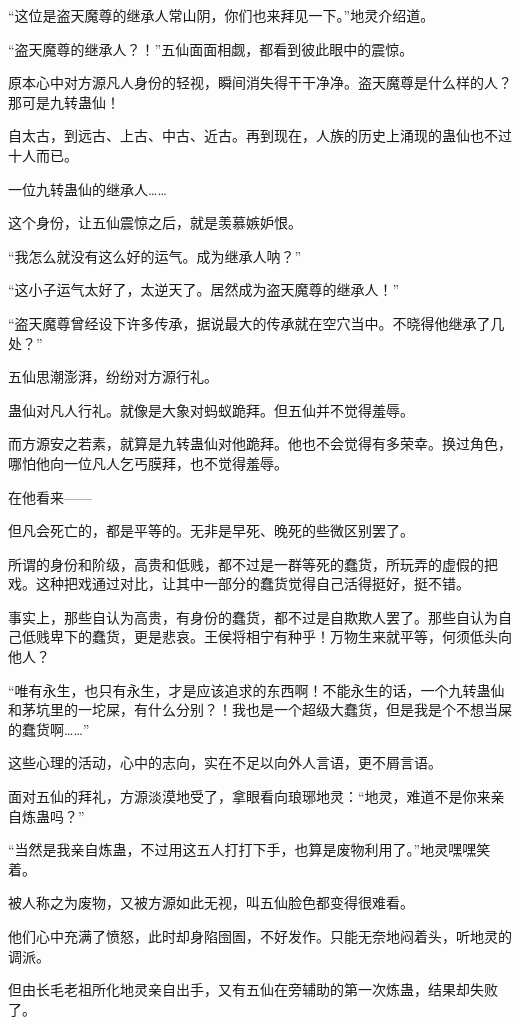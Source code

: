 \begin{this_body}
“这位是盗天魔尊的继承人常山阴，你们也来拜见一下。”地灵介绍道。

“盗天魔尊的继承人？！”五仙面面相觑，都看到彼此眼中的震惊。

原本心中对方源凡人身份的轻视，瞬间消失得干干净净。盗天魔尊是什么样的人？那可是九转蛊仙！

自太古，到远古、上古、中古、近古。再到现在，人族的历史上涌现的蛊仙也不过十人而已。

一位九转蛊仙的继承人……

这个身份，让五仙震惊之后，就是羡慕嫉妒恨。

“我怎么就没有这么好的运气。成为继承人呐？”

“这小子运气太好了，太逆天了。居然成为盗天魔尊的继承人！”

“盗天魔尊曾经设下许多传承，据说最大的传承就在空穴当中。不晓得他继承了几处？”

五仙思潮澎湃，纷纷对方源行礼。

蛊仙对凡人行礼。就像是大象对蚂蚁跪拜。但五仙并不觉得羞辱。

而方源安之若素，就算是九转蛊仙对他跪拜。他也不会觉得有多荣幸。换过角色，哪怕他向一位凡人乞丐膜拜，也不觉得羞辱。

在他看来——

但凡会死亡的，都是平等的。无非是早死、晚死的些微区别罢了。

所谓的身份和阶级，高贵和低贱，都不过是一群等死的蠢货，所玩弄的虚假的把戏。这种把戏通过对比，让其中一部分的蠢货觉得自己活得挺好，挺不错。

事实上，那些自认为高贵，有身份的蠢货，都不过是自欺欺人罢了。那些自认为自己低贱卑下的蠢货，更是悲哀。王侯将相宁有种乎！万物生来就平等，何须低头向他人？

“唯有永生，也只有永生，才是应该追求的东西啊！不能永生的话，一个九转蛊仙和茅坑里的一坨屎，有什么分别？！我也是一个超级大蠢货，但是我是个不想当屎的蠢货啊……”

这些心理的活动，心中的志向，实在不足以向外人言语，更不屑言语。

面对五仙的拜礼，方源淡漠地受了，拿眼看向琅琊地灵：“地灵，难道不是你来亲自炼蛊吗？”

“当然是我亲自炼蛊，不过用这五人打打下手，也算是废物利用了。”地灵嘿嘿笑着。

被人称之为废物，又被方源如此无视，叫五仙脸色都变得很难看。

他们心中充满了愤怒，此时却身陷囹圄，不好发作。只能无奈地闷着头，听地灵的调派。

但由长毛老祖所化地灵亲自出手，又有五仙在旁辅助的第一次炼蛊，结果却失败了。


\end{this_body}
